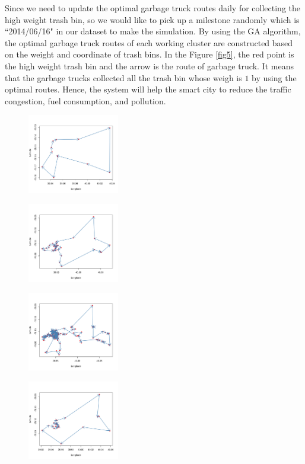 \documentclass[conference,compsoc]{IEEEtran}
\begin{document}
\par Since we need to update the optimal garbage truck routes daily for collecting the high weight trash bin, so we would like to pick up a milestone randomly which is ``2014/06/16" in our dataset to make the simulation. By using the GA algorithm, the optimal garbage truck routes of each working cluster are constructed based on the weight and coordinate of trash bins. In the Figure \ref{fig5}, the red point is the high weight trash bin and the arrow is the route of garbage truck. It means that the garbage trucks collected all the trash bin whose weigh is $1$ by using the optimal routes. Hence, the system will help the smart city to reduce the traffic congestion, fuel consumption, and pollution.

 
\begin{figure}
	\centering
	\parbox{5cm}{
		\includegraphics[width=4cm]{Cluster1}
		\label{fig1a}}
	\begin{minipage}{3cm}
		\includegraphics[width=4cm]{Cluster2}
		\label{fig1b}
	\end{minipage}
	
	\parbox{5cm}{
		\includegraphics[width=4cm]{Cluster3}
		\label{fig1a}}
	\begin{minipage}{3cm}
		\includegraphics[width=4cm]{Cluster4}
		\label{fig1b}
	\end{minipage}
	

\end{figure}
\end{document}
